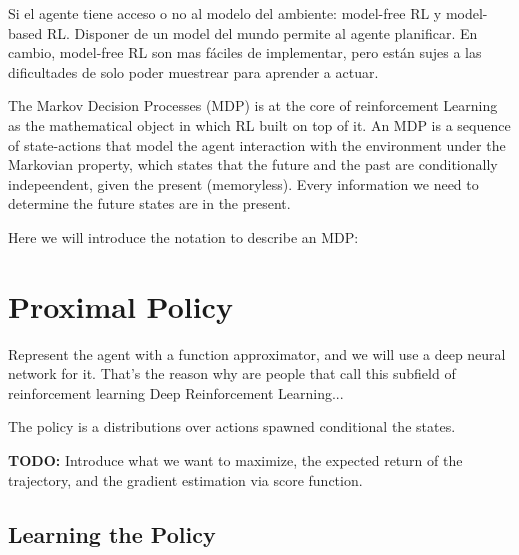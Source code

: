 Si el agente tiene acceso o no al modelo del ambiente: model-free RL y model-based RL. Disponer de un model del mundo permite al agente planificar. 
En cambio, model-free RL son mas fáciles de implementar, pero están
sujes a las dificultades de solo poder muestrear para aprender a 
actuar.

The Markov Decision Processes (MDP) is at the core of reinforcement Learning as the mathematical object in which RL built on top of it. An MDP is a sequence of state-actions that model the agent interaction with the environment under the Markovian property, which states that the future and the past are
conditionally indepeendent, given the present (memoryless). Every information we
need to determine the future states are in the present.

Here we will introduce the notation to describe an MDP:

\section{Proximal Policy}

Represent the agent with a function approximator, and we will use a deep neural network for it. That's the reason why are people that call this subfield of reinforcement learning Deep Reinforcement Learning...

The policy is a distributions over actions spawned conditional the states.

\textbf{TODO:} Introduce what we want to maximize, the expected return of the trajectory, and the gradient estimation via score function.

\subsection{Learning the Policy}


